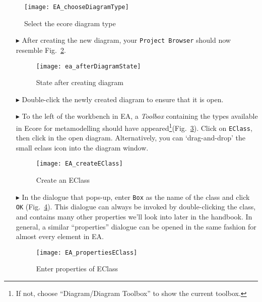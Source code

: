 \pagebreak

\begin{figure}[htbp]
	\centering
  \texttt{[image: EA\_chooseDiagramType]}
	\caption{Select the ecore diagram type}
	\label{fig:diagram_type}
\end{figure}
\FloatBarrier

\begin{itemize}
 
\item[$\blacktriangleright$] After creating the new diagram, your  \texttt{Project Browser} should now resemble Fig.~\ref{fig:diagram_completed}.

\begin{figure}[htbp]
	\centering
  \texttt{[image: ea\_afterDiagramState]}
	\caption{State after creating diagram}
	\label{fig:diagram_completed}
\end{figure}


\item[$\blacktriangleright$] Double-click the newly created diagram to ensure that it is open.


\item[$\blacktriangleright$] To the left of the workbench in EA, a \emph{Toolbox} containing the types available in Ecore for metamodelling should have
appeared\footnote{If not, choose ``Diagram/Diagram Toolbox'' to show the current toolbox.}(Fig.~\ref{fig:eclass}). Click on \texttt{EClass}, then click in the
open diagram. Alternatively, you can `drag-and-drop' the small eclass icon into the diagram window.

\begin{figure}[htbp]
	\centering
  \texttt{[image: EA\_createEClass]}
	\caption{Create an EClass}
	\label{fig:eclass}
\end{figure}



\item[$\blacktriangleright$] In the dialogue that pops-up, enter \texttt{Box} as the name of the class and click \texttt{OK} (Fig.~\ref{fig:eclass_properties}).
This dialogue can always be invoked by double-clicking the class, and contains many other properties we'll look into later in the handbook.
In general, a similar ``properties'' dialogue can be opened in the same fashion for almost every element in EA.

\begin{figure}[htbp]
	\centering
  \texttt{[image: EA\_propertiesEClass]}
	\caption{Enter properties of EClass}
	\label{fig:eclass_properties}
\end{figure}


\end{itemize}
